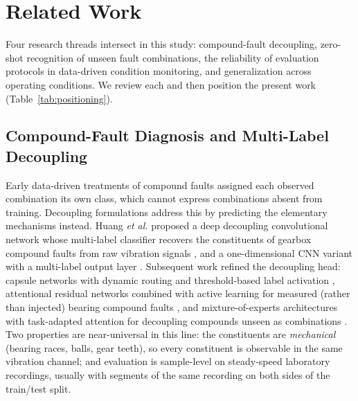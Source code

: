 %

\section{Related Work}
\label{sec:related}

Four research threads intersect in this study: compound-fault decoupling,
zero-shot recognition of unseen fault combinations, the reliability of
evaluation protocols in data-driven condition monitoring, and generalization
across operating conditions. We review each and then position the present work
(Table~\ref{tab:positioning}).

\subsection{Compound-Fault Diagnosis and Multi-Label Decoupling}

Early data-driven treatments of compound faults assigned each observed
combination its own class, which cannot express combinations absent from
training. Decoupling formulations address this by predicting the elementary
mechanisms instead. Huang \emph{et al.} proposed a deep decoupling
convolutional network whose multi-label classifier recovers the constituents of
gearbox compound faults from raw vibration signals \cite{huang2019ddcnn}, and a
one-dimensional CNN variant with a multi-label output layer
\cite{huang2019multilabel}. Subsequent work refined the decoupling head:
capsule networks with dynamic routing and threshold-based label activation
\cite{ltssbow2024}, attentional residual networks combined with active learning
for measured (rather than injected) bearing compound faults
\cite{decoupling_attn2020}, and mixture-of-experts architectures with
task-adapted attention for decoupling compounds unseen as combinations
\cite{hemtan2024}. Two properties are near-universal in this line: the
constituents are \emph{mechanical} (bearing races, balls, gear teeth), so every
constituent is observable in the same vibration channel; and evaluation is
sample-level on steady-speed laboratory recordings, usually with segments of
the same recording on both sides of the train/test split.

